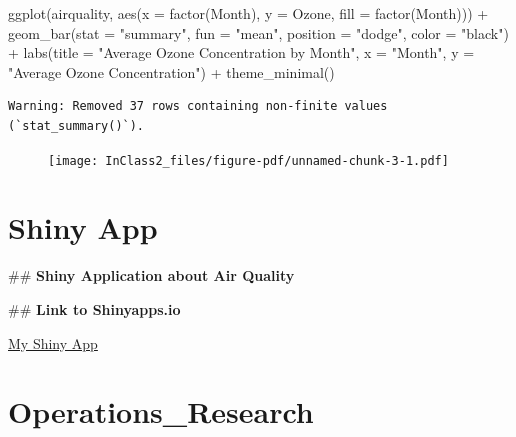 \documentclass[
  letterpaper,
  DIV=11,
  numbers=noendperiod]{scrreprt}
\newenvironment{Shaded}{\begin{snugshade}}{\end{snugshade}}
\newcommand{\AttributeTok}[1]{\textcolor[rgb]{0.40,0.45,0.13}{#1}}
\newcommand{\FunctionTok}[1]{\textcolor[rgb]{0.28,0.35,0.67}{#1}}
\newcommand{\NormalTok}[1]{\textcolor[rgb]{0.00,0.23,0.31}{#1}}
\newcommand{\SpecialCharTok}[1]{\textcolor[rgb]{0.37,0.37,0.37}{#1}}
\newcommand{\StringTok}[1]{\textcolor[rgb]{0.13,0.47,0.30}{#1}}
\begin{document}
\begin{Shaded}
\begin{Highlighting}[]
\FunctionTok{ggplot}\NormalTok{(airquality, }\FunctionTok{aes}\NormalTok{(}\AttributeTok{x =} \FunctionTok{factor}\NormalTok{(Month), }\AttributeTok{y =}\NormalTok{ Ozone, }\AttributeTok{fill =} \FunctionTok{factor}\NormalTok{(Month))) }\SpecialCharTok{+}
  \FunctionTok{geom\_bar}\NormalTok{(}\AttributeTok{stat =} \StringTok{"summary"}\NormalTok{, }\AttributeTok{fun =} \StringTok{"mean"}\NormalTok{, }\AttributeTok{position =} \StringTok{"dodge"}\NormalTok{, }\AttributeTok{color =} \StringTok{"black"}\NormalTok{) }\SpecialCharTok{+}
  \FunctionTok{labs}\NormalTok{(}\AttributeTok{title =} \StringTok{"Average Ozone Concentration by Month"}\NormalTok{,}
       \AttributeTok{x =} \StringTok{"Month"}\NormalTok{,}
       \AttributeTok{y =} \StringTok{"Average Ozone Concentration"}\NormalTok{) }\SpecialCharTok{+}
  \FunctionTok{theme\_minimal}\NormalTok{()}
\end{Highlighting}
\end{Shaded}

\begin{verbatim}
Warning: Removed 37 rows containing non-finite values (`stat_summary()`).
\end{verbatim}

\begin{figure}[H]

{\centering \texttt{[image: InClass2\_files/figure-pdf/unnamed-chunk-3-1.pdf]}

}

\end{figure}


\hypertarget{shiny-app}{%
\chapter{Shiny App}\label{shiny-app}}

\#\# \textbf{Shiny Application about Air Quality}

\#\# \textbf{Link to Shinyapps.io}

\href{https://ozgenursensoy.shinyapps.io/ShinyApp/}{My Shiny App}


\hypertarget{operations_research}{%
\chapter{Operations\_Research}\label{operations_research}}
\end{document}

